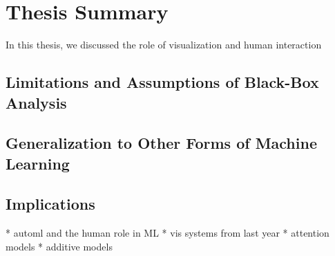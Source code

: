 \chapter{Thesis Summary}
\label{chap:summary}

In this thesis, we discussed the role of visualization and human interaction 

\section{Limitations and Assumptions of Black-Box Analysis}

\section{Generalization to Other Forms of Machine Learning}

\section{Implications}
* automl and the human role in ML
* vis systems from last year
* attention models
* additive models



% 
% 


